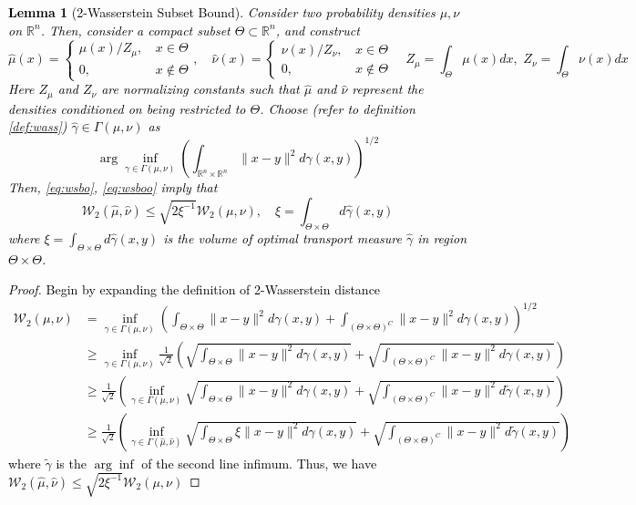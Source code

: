 \documentclass[journal,onecolumn]{IEEEtran}
\newtheorem{lemma}{Lemma}
\newcommand{\reals}{\mathbb{R}}
\newcommand{\wass}{\mathcal{W}_2}
\newcommand{\zconst}{\xi}
\begin{document}
{\textcolor{black}{\begin{lemma}[2-Wasserstein Subset Bound]
\label{lem:wsubset}
Consider two probability densities $\mu,\nu$ on $\reals^n$. Then, consider a compact subset $\Theta \subset \reals^n$, and construct
\begin{equation}
\label{eq:wsbo}
\hat{\mu}(x) = \begin{cases} \mu(x) / Z_{\mu}, \,&x \in \Theta \\ 0, &x\notin \Theta \end{cases}, \quad \hat{\nu}(x) = \begin{cases} \nu(x) / Z_{\nu}, \,&x \in \Theta \\ 0, &x\notin \Theta \end{cases} \quad Z_{\mu} = \int_{\Theta} \mu(x)dx,\,\,Z_{\nu} = \int_{\Theta}\nu(x)dx
\end{equation}
Here $Z_{\mu}$ and $Z_{\nu}$ are normalizing constants such that $\hat{\mu}$ and $\hat{\nu}$ represent the densities conditioned on being restricted to $\Theta$. Choose (refer to definition \eqref{def:wass}) $\hat{\gamma} \in \Gamma(\mu,\nu)$ as 
\begin{equation}
    \label{eq:wsboo}
    \arg\inf_{\gamma \in \Gamma(\mu,\nu)}\left(\int_{\reals^n \times\reals^n} \|x-y\|^2d\gamma(x,y) \right)^{1/2}
\end{equation} Then, \eqref{eq:wsbo}, \eqref{eq:wsboo} imply that 
\[\wass(\hat{\mu},\hat{\nu}) \leq \sqrt{2\zconst^{-1}}\wass(\mu,\nu), \quad \zconst = \int_{\Theta \times \Theta} d\hat{\gamma}(x,y)\]
where $\zconst = \int_{\Theta \times \Theta}d\hat{\gamma}(x,y)$ is the volume of optimal transport measure $\hat{\gamma}$ in region $\Theta \times \Theta$.
\end{lemma}
\begin{proof}
Begin by expanding the definition of 2-Wasserstein distance 
\begin{align*}
\wass(\mu,\nu) &= \inf_{\gamma \in \Gamma(\mu,\nu)}\left( \int_{\Theta \times \Theta}\|x-y\|^2d\gamma(x,y) + \int_{(\Theta \times \Theta)^C}\|x-y\|^2d\gamma(x,y)\right)^{1/2}\\ 
&\geq \inf_{\gamma \in \Gamma(\mu,\nu)}\frac{1}{\sqrt{2}}\left(\sqrt{\int_{\Theta \times \Theta}\|x-y\|^2d\gamma(x,y)} + \sqrt{\int_{(\Theta \times \Theta)^C}\|x-y\|^2d\gamma(x,y)} \right) \\
&\geq \frac{1}{\sqrt{2}}\left(\inf_{\gamma \in \Gamma(\mu,\nu)}\sqrt{\int_{\Theta \times \Theta}\| x-y\|^2d\gamma(x,y)} + \sqrt{\int_{(\Theta \times \Theta)^C}\|x-y\|^2d\tilde{\gamma}(x,y)}\right) \\
&\geq \frac{1}{\sqrt{2}}\left(\inf_{\gamma \in \Gamma(\hat{\mu},\hat{\nu})}\sqrt{\int_{\Theta \times \Theta}\zconst\|x-y\|^2d\gamma(x,y)} + \sqrt{\int_{(\Theta \times \Theta)^C}\|x-y\|^2d\tilde{\gamma}(x,y)}\right)
\end{align*}
where $\tilde{\gamma}$ is the $\arg\inf$ of the second line infimum. 
Thus, we have $\wass(\hat{\mu},\hat{\nu}) \leq \sqrt{2\zconst^{-1}}\wass(\mu,\nu)$
\end{proof}}

}
\end{document}
